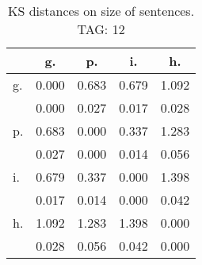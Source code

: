 \begin{table}[h!]
\begin{center}
\begin{tabular}{| l | c | c | c | c |}\hline
 & g. & p. & i. & h. \\\hline
g. & 0.000  & 0.683  & 0.679  & 1.092 \\\hline
 & 0.000  & 0.027  & 0.017  & 0.028 \\\hline
p. & 0.683  & 0.000  & 0.337  & 1.283 \\\hline
 & 0.027  & 0.000  & 0.014  & 0.056 \\\hline
i. & 0.679  & 0.337  & 0.000  & 1.398 \\\hline
 & 0.017  & 0.014  & 0.000  & 0.042 \\\hline
h. & 1.092  & 1.283  & 1.398  & 0.000 \\\hline
 & 0.028  & 0.056  & 0.042  & 0.000 \\\hline
\end{tabular}
\caption{KS distances on size of sentences. TAG: 12}
\end{center}
\end{table}